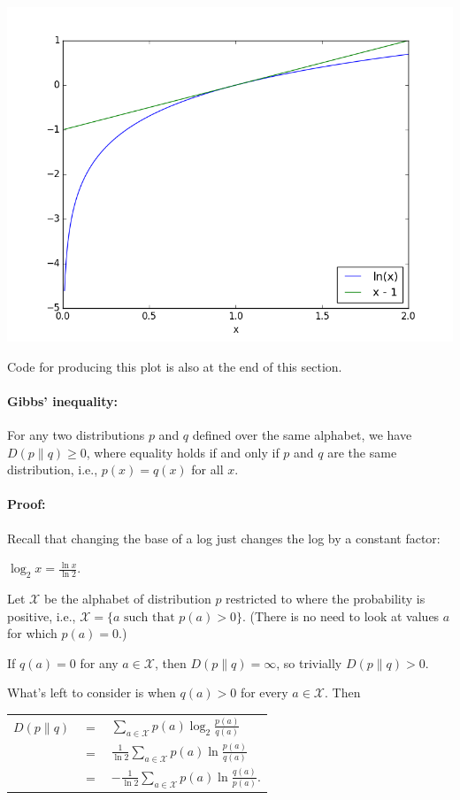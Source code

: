 \documentclass[6008notes.tex]{subfiles}
\begin{document}
{\centering\includegraphics[scale=0.4]{images_sec-gibbs-inequality-helper} \par}

Code for producing this plot is also at the end of this section.

\paragraph{Gibbs' inequality:} For any two distributions $p$ and $q$ defined over the same alphabet, we have $D(p\parallel q)\ge 0$, where equality holds if and only if $p$ and $q$ are the same distribution, i.e., $p(x)=q(x)$ for all $x$.

\paragraph{Proof:} Recall that changing the base of a log just changes the log by a constant factor:

{\centering$\log _{2}x=\frac{\ln x}{\ln 2}.$ \par}

Let $\mathcal{X}$ be the alphabet of distribution $p$ restricted to where the probability is positive, i.e., $\mathcal{X}=\{ a\text { such that }p(a)>0\}$. (There is no need to look at values $a$ for which $p(a)=0$.)

If $q(a)=0$ for any $a\in \mathcal{X}$, then $D(p\parallel q)=\infty$, so trivially $D(p\parallel q)>0$.

What's left to consider is when $q(a)>0$ for every $a\in \mathcal{X}$. Then

{\renewcommand{\arraystretch}{1.5}
\begin{tabular}{l l l}
$D(p\parallel q)$ & $=$ & $\sum _{a\in \mathcal{X}}p(a)\log _{2}\frac{p(a)}{q(a)}$ \\
  & $=$ & $\frac{1}{\ln 2}\sum _{a\in \mathcal{X}}p(a)\ln \frac{p(a)}{q(a)}$ \\
  & $=$ & $-\frac{1}{\ln 2}\sum _{a\in \mathcal{X}}p(a)\ln \frac{q(a)}{p(a)}.$ 
\end{tabular}}
		
\end{document}

